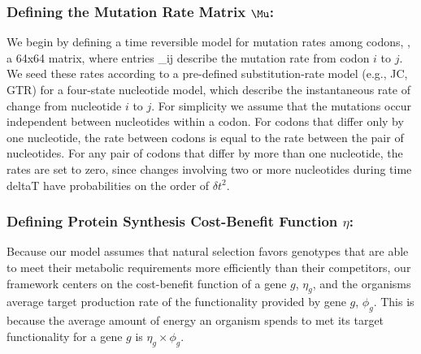 \documentclass{article}
\newcommand{\phig}{\ensuremath{\phi_{g}}\xspace}
\begin{document}
\subsubsection*{Defining the Mutation Rate Matrix $\Mu$: }
We begin by defining a time reversible model for mutation rates among codons, \Mu, a 64x64 matrix, where entries \mu_ij describe the mutation rate from codon $i$ to $j$.
We seed these rates according to a pre-defined substitution-rate model (e.g., JC, GTR) for a four-state nucleotide model, which describe the instantaneous rate of change from nucleotide $i$ to $j$.
For simplicity we assume that the mutations occur independent between nucleotides within a codon. 
For codons that differ only by one nucleotide, the rate between codons is equal to the rate between the pair of nucleotides.
For any pair of codons that differ by more than one nucleotide, the rates are set to zero, since changes involving two or more nucleotides during time deltaT have probabilities on the order of $\delta t^2$. 

\subsubsection*{Defining Protein Synthesis Cost-Benefit Function $\eta$: }
Because our model assumes that natural selection favors genotypes that are able to meet their metabolic requirements more efficiently than their competitors, our framework centers on the cost-benefit function of a gene $g$, $\eta_g$, and the organisms average target production rate of the functionality provided by gene $g$, $\phig$.
This is because the average amount of energy an organism spends to met its target functionality for a gene $g$ is $\eta_g \times \phig$.
 
\end{document}
